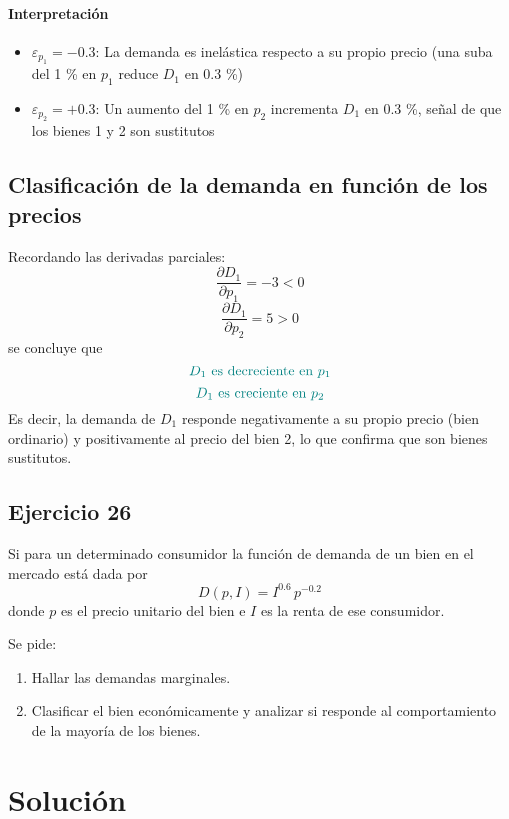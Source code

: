 \documentclass{article}
\begin{document}
\paragraph{Interpretación}
\begin{itemize}
  \item {\color{teal}\(\varepsilon_{p_{1}}=-0.3\):{ La demanda es inelástica respecto a su propio precio (una suba del 1 \% en \(p_{1}\) reduce \(D_{1}\) en 0.3 \%)}}
  \item{\color{teal} \(\varepsilon_{p_{2}}=+0.3\): {Un aumento del 1 \% en \(p_{2}\) incrementa \(D_{1}\) en 0.3 \%, señal de que los bienes 1 y 2 son sustitutos}}
\end{itemize}



\subsection*{Clasificación de la demanda en función de los precios}

Recordando las derivadas parciales:
\[
\frac{\partial D_{1}}{\partial p_{1}}=-3<0
\]
\[
\frac{\partial D_{1}}{\partial p_{2}}=5>0
\]
se concluye que
\[
\color{teal}{D_{1}\text{ es decreciente en }p_{1}}
\]
\[
\color{teal}{D_{1}\text{ es creciente en }p_{2}}
\]
Es decir, la demanda de \(D_{1}\) responde negativamente a su propio precio (bien {\color{teal}ordinario}) y positivamente al precio del bien 2, {lo que confirma que son bienes {\color{teal}sustitutos}}.


\newpage
\subsection{Ejercicio 26}

Si para un determinado consumidor la función de demanda de un bien en el mercado está dada por
\[
D(p, I) = I^{0.6}\,p^{-0.2}
\]
donde \(p\) es el precio unitario del bien e \(I\) es la renta de ese consumidor.

\medskip

Se pide:
\begin{enumerate}
  \item Hallar las demandas marginales.
  \item Clasificar el bien económicamente y analizar si responde al comportamiento de la mayoría de los bienes.
\end{enumerate}

\newpage
\section*{Solución}
\end{document}
